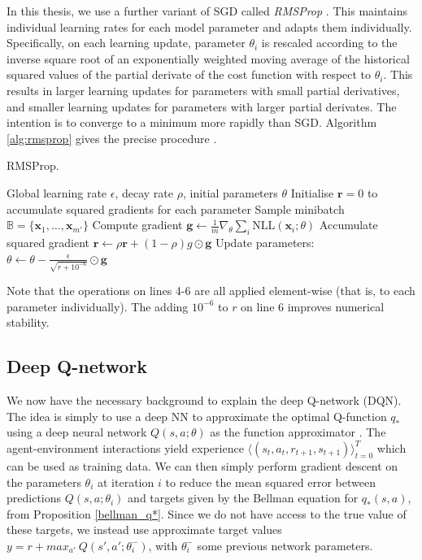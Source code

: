 \documentclass[11pt, a4paper, bibliography=totoc]{report}
\newcommand{\x}{\mathbf{x}}
\begin{document}
In this thesis, we use a further variant of SGD called \textit{RMSProp} \cite{tieleman2012lecture}. This maintains individual learning rates for each model parameter and adapts them individually. Specifically, on each learning update, parameter $ \theta_i $ is rescaled according to the inverse square root of an exponentially weighted moving average of the historical squared values of the partial derivate of the cost function with respect to $ \theta_i $. This results in larger learning updates for parameters with small partial derivatives, and smaller learning updates for parameters with larger partial derivates. The intention is to converge to a minimum more rapidly than SGD. Algorithm \ref {alg:rmsprop} gives the precise procedure \cite[p.~304]{Goodfellow-et-al-2016}. 
\begin{algorithm}
	\caption{RMSProp.}
	\label{alg:rmsprop}
	\begin{algorithmic}[1]
		\Require Global learning rate $ \epsilon $, decay rate $ \rho $, initial parameters $ \theta $
		\State Initialise $ \mathbf{r} = 0 $ to accumulate squared gradients for each parameter
		\Repeat
		\State Sample minibatch $ \mathbb{B} = \{\x_1, \dots, \x_{m'} \} $
		\State Compute gradient $ \mathbf{g} \gets \frac{1}{m} \nabla_\theta \sum_i \text{NLL}(\x_i ; \theta) $
		\State Accumulate squared gradient $ \mathbf{r} \gets \rho \mathbf{r} + (1-\rho) {g} \odot \mathbf{g}  $
		\State Update parameters: $ \theta \gets \theta - \frac{\epsilon}{\sqrt{r + 10^{-6}}}\odot \mathbf{g} $
	\end{algorithmic}
\end{algorithm}
Note that the operations on lines 4-6 are all applied element-wise (that is, to each parameter individually). The adding $ 10^{-6} $ to $ r $ on line 6 improves numerical stability.

\subsection{Deep Q-network} \label{DQN}
We now have the necessary background to explain the deep Q-network (DQN). The idea is simply to use a deep NN to approximate the optimal Q-function $ q_* $ using a deep neural network $ Q(s,a; \theta) $ as the function approximator \cite{Mnih2015}. The agent-environment interactions yield experience $\langle (s_t, a_t, r_{t+1}, s_{t+1}) \rangle_{t=0}^T $ which can be used as training data. We can then simply perform gradient descent on the parameters $ \theta_i $ at iteration $ i $ to reduce the mean squared error between predictions $ Q(s,a; \theta_i) $ and targets given by the Bellman equation for $ q_*(s,a) $, from Proposition \ref{bellman_q*}. Since we do not have access to the true value of these targets, we instead use approximate target values $ y = r + max_{a'} ~ Q(s', a' ; \theta_i^-) $, with $ \theta_i^- $ some previous network parameters.
\end{document}
